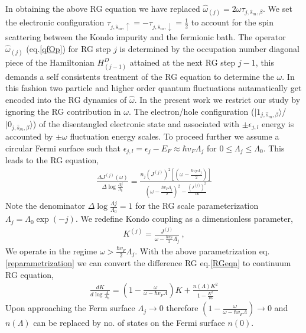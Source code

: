 \documentclass[aps,prl,preprint,groupedaddress]{revtex4-2}
\begin{document}
In obtaining the above RG equation we have replaced  $\hat{\omega}_{(j)}=2\omega\tau_{j,\hat{s}_{m},\beta}$. We set the electronic configuration $\tau_{j,\hat{s}_{m},\uparrow}=-\tau_{j,\hat{s}_{m},\downarrow}=\frac{1}{2}$ to account for the spin scattering between the Kondo impurity and the fermionic bath.  The operator $\hat{\omega}_{(j)}$ (eq.\eqref{qfOp}) for RG step $j$ is determined by the occupation number diagonal piece of the Hamiltonian  $H^{D}_{(j-1)}$ attained at the next RG step $j-1$, this demands a self consistents treatment of the RG equation to determine the $\omega$. In this fashion two particle and higher order quantum fluctuations autamatically get  encoded into the RG dynamics of $\hat{\omega}$. In the present work we restrict our study by ignoring the RG contribution in $\omega$. The electron/hole configuration ($|1_{j,\hat{s}_{m},\beta}\rangle$/$|0_{j,\hat{s}_{m},\beta}\rangle$)  of the disentangled electronic state and associated with $\pm \epsilon_{j,l}$ energy is accounted by $\pm\omega$ fluctuation energy scales. To proceed further we assume a circular Fermi surface such that $\epsilon_{j,l}=\epsilon_{j}-E_{F}\approx\hbar v_{F}\Lambda_{j}$ for $0\leq\Lambda_{j}\leq\Lambda_{0}$. This leads to the RG equation,
\begin{eqnarray}
\frac{\Delta J^{(j)}(\omega)}{\Delta\log\frac{\Lambda{j}}{\Lambda_{0}}}=\frac{n_{j}(J^{(j)})^{2}\left[(\omega - \frac{\hbar v_{F}\Lambda_{j}}{2})\right]}{(\omega - \frac{\hbar v_{F}\Lambda_{j}}{2})^{2}-\frac{\left(J^{(j)}\right)^{2}}{16}}\label{RGeqn}
\end{eqnarray}
Note the denominator $\Delta\log\frac{\Lambda{j}}{\Lambda_{0}} =1$ for the RG scale parameterization $\Lambda_{j}=\Lambda_{0}\exp(-j)$. We redefine Kondo coupling as a dimensionless parameter,
\begin{eqnarray}
K^{(j)}=\frac{J^{(j)}}{\omega-\frac{\hbar v_{F}}{2}\Lambda_{j}}~,\label{reparametrization}
\end{eqnarray} 
We operate in the regime $\omega>\frac{\hbar v_{F}}{2}\Lambda_{j}$. 
With the above parametrization eq.\eqref{reparametrization} we can convert the difference RG eq.\eqref{RGeqn} to continuum RG equation,
\begin{eqnarray}
\frac{d K}{d\log\frac{\Lambda}{\Lambda_{0}}}=\left(1-\frac{\omega}{\omega-\hbar v_{F}\Lambda}\right)K+\frac{n(\Lambda)K^{2}}{1-\frac{K^{2}}{16}}
\end{eqnarray}
Upon approaching the Ferm surface $\Lambda_{j}\to 0$ therefore $\left(1-\frac{\omega}{\omega-\hbar v_{F}\Lambda}\right)\to 0$ and $n(\Lambda)$ can be replaced by no. of states on the Fermi surface $n(0)$.
\end{document}
